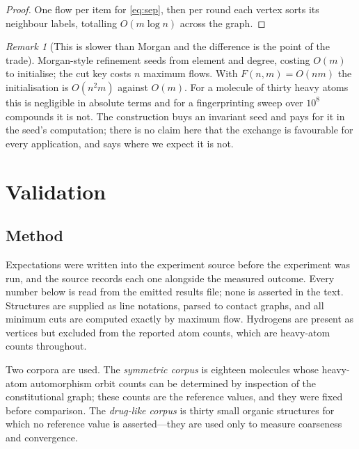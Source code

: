 \documentclass[11pt,twocolumn,a4paper]{article}
\theoremstyle{crthm}
\theoremstyle{definition}
\theoremstyle{remark}
\newtheorem{remark}[theorem]{Remark}
\begin{document}
\begin{proof}
One flow per item for \eqref{eq:sep}, then per round each vertex sorts its
neighbour labels, totalling $O(m\log n)$ across the graph.
\end{proof}

\begin{remark}[This is slower than Morgan and the difference is the point
of the trade]
\label{rem:slower}
Morgan-style refinement seeds from element and degree, costing $O(m)$ to
initialise; the cut key costs $n$ maximum flows. With
$F(n,m)=O(nm)$ \citep{orlin2013} the initialisation is $O(n^2m)$ against
$O(m)$. For a molecule of thirty heavy atoms this is negligible in
absolute terms and for a fingerprinting sweep over $10^8$ compounds it is
not. The construction buys an invariant seed and pays for it in the seed's
computation; there is no claim here that the exchange is favourable for
every application, and  says where we expect it is not.
\end{remark}

\section{Validation}
\label{sec:validation}

\subsection{Method}

Expectations were written into the experiment source before the
experiment was run, and the source records each one alongside the measured
outcome. Every number below is read from the emitted results file; none
is asserted in the text. Structures are supplied as line notations, parsed
to contact graphs, and all minimum cuts are computed exactly by maximum
flow. Hydrogens are present as vertices but excluded from the reported
atom counts, which are heavy-atom counts throughout.

Two corpora are used. The \emph{symmetric corpus} is eighteen molecules
whose heavy-atom automorphism orbit counts can be determined by
inspection of the constitutional graph; these counts are the reference
values, and they were fixed before comparison. The \emph{drug-like
corpus} is thirty small organic structures for which no reference value
is asserted---they are used only to measure coarseness and convergence.
\end{document}
